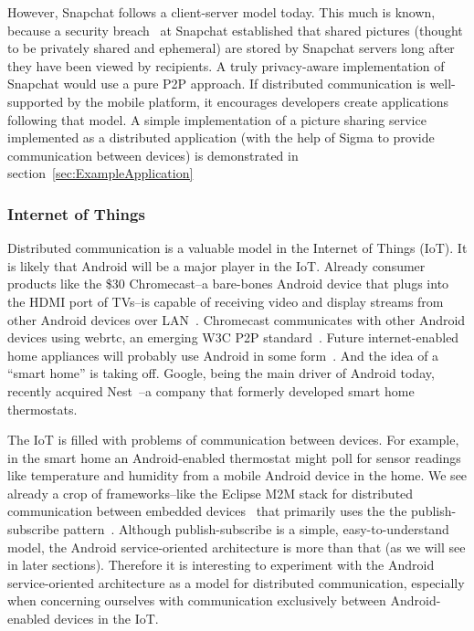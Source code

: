 \documentclass[prodmode]{acmlarge}
\begin{document}
However, Snapchat follows a client-server model today. This much is known, because a security breach~\cite{SnapchatHack} at Snapchat established that shared pictures (thought to be privately shared and ephemeral) are stored by Snapchat servers long after they have been viewed by recipients. A truly privacy-aware implementation of Snapchat would use a pure P2P approach. If distributed communication is well-supported by the mobile platform, it encourages developers create applications following that model. A simple implementation of a picture sharing service implemented as a distributed application (with the help of Sigma to provide communication between devices) is demonstrated in section~\ref{sec:ExampleApplication}

\subsubsection{Internet of Things}
Distributed communication is a valuable model in the Internet of Things (IoT). It is likely that Android will be a major player in the IoT. Already consumer products like the \$30 Chromecast--a bare-bones Android device that plugs into the HDMI port of TVs--is capable of receiving video and display streams from other Android devices over LAN~\cite{chromecast}. Chromecast communicates with other Android devices using webrtc, an emerging W3C P2P standard~\cite{ChromecastWebrtc}. Future internet-enabled home appliances will probably use Android in some form~\cite{AndroidEverywhere}. And the idea of a ``smart home'' is taking off. Google, being the main driver of Android today, recently acquired Nest~\cite{GoogleNest}--a company that formerly developed smart home thermostats.

The IoT is filled with problems of communication between devices. For example, in the smart home an Android-enabled thermostat might poll for sensor readings like temperature and humidity from a mobile Android device in the home. We see already a crop of frameworks--like the Eclipse M2M stack for distributed communication between embedded devices~\cite{eclipse_m2m} that primarily uses the the publish-subscribe pattern~\cite{PublishSubscribe}. Although publish-subscribe is a simple, easy-to-understand model, the Android service-oriented architecture is more than that (as we will see in later sections). Therefore it is interesting to experiment with the Android service-oriented architecture as a model for distributed communication, especially when concerning ourselves with communication exclusively between Android-enabled devices in the IoT.
\end{document}

